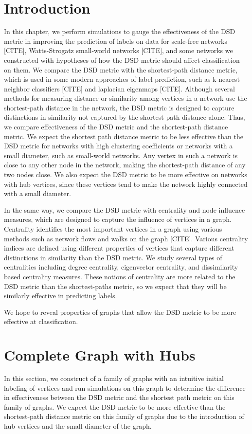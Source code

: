 \section{Introduction}

In this chapter, we perform simulations to gauge the effectiveness of the DSD metric in improving the prediction of labels on data for scale-free networks [CITE], Watts-Strogatz small-world networks [CITE], and some networks we constructed with hypotheses of how the DSD metric should affect classification on them. We compare the DSD metric with the shortest-path distance metric, which is used in some modern approaches of label prediction, such as k-nearest neighbor classifiers [CITE] and laplacian eigenmaps [CITE]. Although several methods for measuring distance or similarity among vertices in a network use the shortest-path distance in the network, the DSD metric is designed to capture distinctions in similarity not captured by the shortest-path distance alone. Thus, we compare effectiveness of the DSD metric and the shortest-path distance metric. We expect the shortest path distance metric to be less effective than the DSD metric for networks with high clustering coefficients or networks with a small diameter, such as small-world networks. Any vertex in such a network is close to any other node in the network, making the shortest-path distance of any two nodes close. We also expect the DSD metric to be more effective on networks with hub vertices, since these vertices tend to make the network highly connected with a small diameter.

In the same way, we compare the DSD metric with centrality and node influence measures, which are designed to capture the influence of vertices in a graph. Centrality identifies the most important vertices in a graph using various methods such as network flows and walks on the graph [CITE]. Various centrality indices are defined using different properties of vertices that capture different distinctions in similarity than the DSD metric. We study several types of centralities including degree centrality, eigenvector centrality, and dissimilarity based centrality measures. These notions of centrality are more related to the DSD metric than the shortest-paths metric, so we expect that they will be similarly effective in predicting labels.

We hope to reveal properties of graphs that allow the DSD metric to be more effective at classification.

\section{Complete Graph with Hubs}
In this section, we construct of a family of graphs with an intuitive initial labeling of vertices and run simulations on this graph to determine the difference in effectiveness between the DSD metric and the shortest path metric on this family of graphs. We expect the DSD metric to be more effective than the shortest-path distance metric on this family of graphs due to the introduction of hub vertices and the small diameter of the graph.

